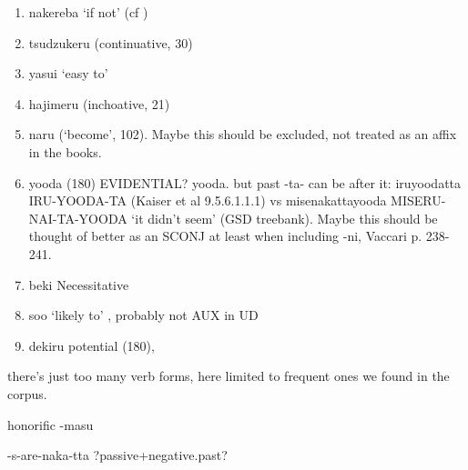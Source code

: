 \begin{enumerate}
\item nakereba `if not' (cf \cite[9.3.1.4]{kaiser2013japanese})
\item tsudzukeru (continuative, 30)
\item yasui `easy to'
\item hajimeru (inchoative, 21)
\item naru (`become', 102). Maybe this should be excluded, not treated as an affix in the books.
\item yooda (180) EVIDENTIAL? yooda. but past -ta- can be after it: iruyoodatta IRU-YOODA-TA (Kaiser et al 9.5.6.1.1.1) vs misenakattayooda MISERU-NAI-TA-YOODA `it didn't seem' (GSD treebank). Maybe this should be thought of better as an SCONJ at least when including -ni, Vaccari p. 238-241.
\item beki Necessitative \cite[248]{kaiser2013japanese}
\item soo `likely to' \cite[258]{kaiser2013japanese}, probably not AUX in UD
\item dekiru potential (180), 
\end{enumerate}


there's just too many verb forms, here limited to frequent ones we found in the corpus.











honorific -masu

-s-are-naka-tta ?passive+negative.past?



